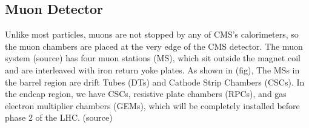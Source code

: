 \subsection{Muon Detector}
Unlike most particles, muons are not stopped by any of CMS’s calorimeters, so the muon chambers are placed at the very edge of the CMS detector. The muon system (source) has four muon stations (MS), which sit outside the magnet coil and are interleaved with iron return yoke plates. As shown in (fig), The MSs in the barrel region are drift Tubes (DTs) and Cathode Strip Chambers (CSCs). In the endcap region, we have CSCs, resistive plate chambers (RPCs), and gas electron multiplier chambers (GEMs), which will be completely installed before phase 2 of the LHC. (source)   


